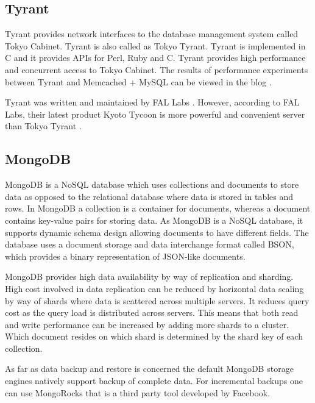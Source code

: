 {     \pv
     
\subsection{Tyrant}

     Tyrant provides network interfaces to the database management
     system called Tokyo Cabinet. Tyrant is also called as Tokyo
     Tyrant. Tyrant is implemented in C and it provides APIs for Perl,
     Ruby and C. Tyrant provides high performance and concurrent
     access to Tokyo Cabinet. The results of performance experiments
     between Tyrant and Memcached + MySQL can be viewed
     in the blog \cite{www-tyrant-blog}.

     Tyrant was written and maintained by FAL Labs
     \cite{www-tyrant-fal-labs}.  However, according to FAL Labs,
     their latest product Kyoto Tycoon is more powerful and convenient
     server than Tokyo Tyrant \cite{www-kyoto-tycoon}.

     \pv


\subsection{MongoDB}

     MongoDB is a NoSQL database which uses collections and documents
     to store data as opposed to the relational database where data is
     stored in tables and rows. In MongoDB a collection is a container
     for documents, whereas a document contains key-value pairs for
     storing data. As MongoDB is a NoSQL database, it supports dynamic
     schema design allowing documents to have different fields. The
     database uses a document storage and data interchange format
     called BSON, which provides a binary representation of JSON-like
     documents.

     MongoDB provides high data availability by way of replication and
     sharding. High cost involved in data replication can be reduced
     by horizontal data scaling by way of shards where data is
     scattered across multiple servers. It reduces query cost as the
     query load is distributed across servers. This means that both
     read and write performance can be increased by adding more shards
     to a cluster. Which document resides on which shard is determined
     by the shard key of each collection.

     As far as data backup and restore is concerned the default
     MongoDB storage engines natively support backup of complete
     data. For incremental backups one can use MongoRocks that is a
     third party tool developed by Facebook.

}
